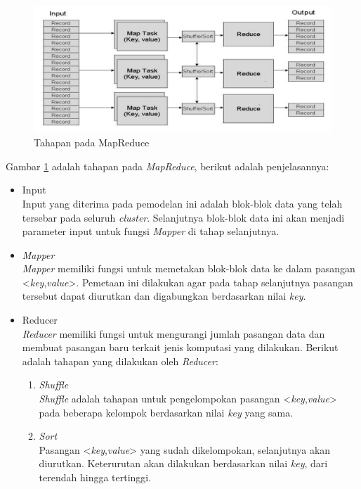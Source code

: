 \documentclass[a4paper,twoside]{article}
\begin{document}
\begin{enumerate}
\begin{figure}[H]
	\centering
	\includegraphics[scale=0.4]{MapReduceImage}
	\caption{Tahapan pada MapReduce}
	\label{fig:MapReduceImage}
\end{figure}

\noindent Gambar \ref{fig:MapReduceImage} adalah tahapan pada \textit{MapReduce}, berikut adalah penjelasannya:

\begin{itemize}
\item Input\\
Input yang diterima pada pemodelan ini adalah blok-blok data yang telah tersebar pada seluruh \textit{cluster}. Selanjutnya blok-blok data ini akan menjadi parameter input untuk fungsi \textit{Mapper} di tahap selanjutnya.

\item \textit{Mapper}\\
\textit{Mapper} memiliki fungsi untuk memetakan blok-blok data ke dalam pasangan <\textit{key},\textit{value}>. Pemetaan ini dilakukan agar pada tahap selanjutnya pasangan tersebut dapat diurutkan dan digabungkan berdasarkan nilai \textit{key}.

\item Reducer\\
\textit{Reducer} memiliki fungsi untuk mengurangi jumlah pasangan data dan membuat pasangan baru terkait jenis komputasi yang dilakukan. Berikut adalah tahapan yang dilakukan oleh \textit{Reducer}:

\begin{enumerate}

\item \textit{Shuffle} \\
\textit{Shuffle} adalah tahapan untuk pengelompokan pasangan <\textit{key},\textit{value}> pada beberapa kelompok berdasarkan nilai \textit{key} yang sama.


\item \textit{Sort} \\
Pasangan <\textit{key},\textit{value}> yang sudah dikelompokan, selanjutnya akan diurutkan. Keterurutan akan dilakukan berdasarkan nilai \textit{key}, dari terendah hingga tertinggi. 



\end{enumerate}
\end{itemize}
\end{enumerate}
\end{document}
